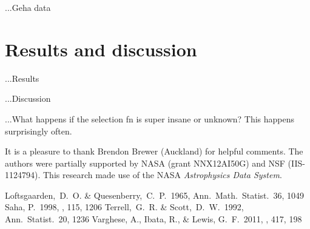 \documentclass[12pt,pdftex,preprint]{aastex}
\begin{document}
...Geha data

\section{Results and discussion}

...Results

...Discussion

...What happens if the selection fn is super insane or unknown?  This
happens surprisingly often.

\acknowledgements It is a pleasure to thank
  Brendon Brewer (Auckland)
for helpful comments.  The authors were partially supported by NASA
(grant NNX12AI50G) and NSF (IIS-1124794).  This research made use of
the NASA \textsl{Astrophysics Data System}.

\begin{thebibliography}{}
  Loftsgaarden,~D.~O. \& Quesenberry,~C.~P.\ 1965, Ann.\ Math.\ Statist.\ 36, 1049
  Saha, P.\ 1998, \aj, 115, 1206 
  Terrell,~G.~R. \& Scott,~D.~W.\ 1992, Ann.\ Statist.\ 20, 1236
  Varghese, A., Ibata, R., \& Lewis, G.~F.\ 2011, \mnras, 417, 198 
\end{thebibliography}
\end{document}
